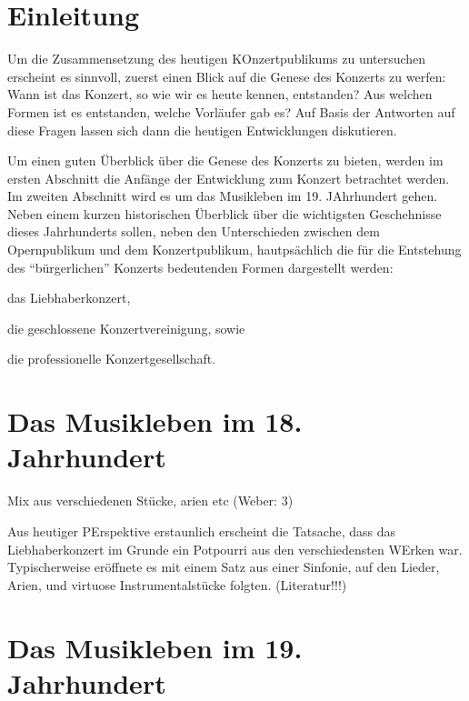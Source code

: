\documentclass[a4paper, german, oneside]{scrbook}
\begin{document}
\begingroup
\renewcommand{\cleardoublepage}{}
\renewcommand{\clearpage}{}

\chapter{Einleitung}
Um die Zusammensetzung des heutigen KOnzertpublikums zu untersuchen erscheint es sinnvoll, zuerst einen Blick auf die Genese des Konzerts zu werfen: Wann ist das Konzert, so wie wir es heute kennen, entstanden? Aus welchen Formen ist es entstanden, welche Vorläufer gab es? Auf Basis der Antworten auf diese Fragen lassen sich dann die heutigen Entwicklungen diskutieren.

Um einen guten Überblick über die Genese des Konzerts zu bieten, werden im ersten Abschnitt die Anfänge der Entwicklung zum Konzert betrachtet werden. Im zweiten Abschnitt wird es um das Musikleben im 19. JAhrhundert gehen. Neben einem kurzen historischen Überblick über die wichtigsten Geschehnisse dieses Jahrhunderts sollen, neben den Unterschieden zwischen dem Opernpublikum und dem Konzertpublikum, hautpsächlich die für die Entstehung des \enquote{bürgerlichen} Konzerts bedeutenden Formen dargestellt werden: 
\begin{inparaenum}[(1)]
	\item das Liebhaberkonzert, 
	\item die geschlossene Konzertvereinigung, sowie 
	\item die professionelle Konzertgesellschaft.
\end{inparaenum}



\chapter{Das Musikleben im 18. Jahrhundert}
\label{18jh}
Mix aus verschiedenen Stücke, arien etc (Weber: 3)

Aus heutiger PErspektive erstaunlich erscheint die Tatsache, dass das Liebhaberkonzert im Grunde ein Potpourri aus den verschiedensten WErken war. Typischerweise eröffnete es mit einem Satz aus einer Sinfonie, auf den Lieder, Arien, und virtuose Instrumentalstücke folgten. (Literatur!!!)


\endgroup

\chapter{Das Musikleben im 19. Jahrhundert}
\label{19jh}
\end{document}
